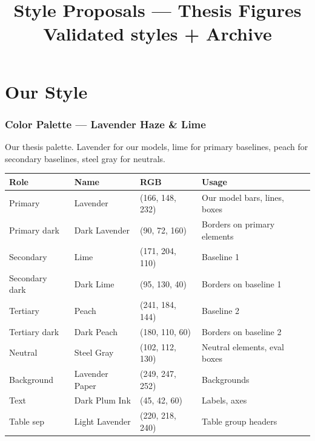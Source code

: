 \documentclass[11pt, a4paper]{article}
\title{\bfseries Style Proposals — Thesis Figures\\[0.3em]\large Validated styles + Archive}
\author{}
\date{}
\begin{document}
\maketitle
\thispagestyle{empty}

\tableofcontents
\newpage


\part*{Our Style}

\section{Color Palette — Lavender Haze \& Lime}
\label{sec:palette}

Our thesis palette. Lavender for our models, lime for primary baselines, peach for secondary baselines, steel gray for neutrals.

\bigskip


\bigskip

\begin{tabular}{llll}
\toprule
\textbf{Role} & \textbf{Name} & \textbf{RGB} & \textbf{Usage} \\
\midrule
Primary       & Lavender & (166, 148, 232) & Our model bars, lines, boxes \\
Primary dark  & Dark Lavender & (90, 72, 160) & Borders on primary elements \\
Secondary     & Lime & (171, 204, 110) & Baseline 1 \\
Secondary dark & Dark Lime & (95, 130, 40) & Borders on baseline 1 \\
Tertiary      & Peach & (241, 184, 144) & Baseline 2 \\
Tertiary dark & Dark Peach & (180, 110, 60) & Borders on baseline 2 \\
Neutral       & Steel Gray & (102, 112, 130) & Neutral elements, eval boxes \\
Background    & Lavender Paper & (249, 247, 252) & Backgrounds \\
Text          & Dark Plum Ink & (45, 42, 60) & Labels, axes \\
Table sep     & Light Lavender & (220, 218, 240) & Table group headers \\
\bottomrule
\end{tabular}
\end{document}
